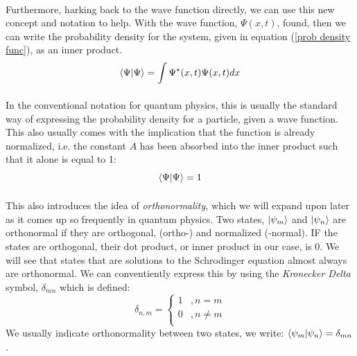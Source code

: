 \documentclass[12pt,letterpaper]{book}
\begin{document}
\paragraph*{}Furthermore, harking back to the wave function directly, we can use this new concept and notation to help. With the wave function, $\Psi(x,t)$, found, then we can write the probability density for the system, given in equation (\ref{prob density func}), as an inner product.
\begin{equation}
\label{inner prod integral}
\braket{\Psi}{\Psi} = \int \Psi^*(x,t) \Psi(x,t) dx
\end{equation}
\paragraph*{}In the conventional notation for quantum physics, this is usually the standard way of expressing the probability density for a particle, given a wave function. This also usually comes with the implication that the function is already normalized, i.e. the constant $A$ has been absorbed into the inner product such that it alone is equal to 1:
\begin{equation}
\braket{\Psi}{\Psi} = 1
\end{equation}
\paragraph*{}This also introduces the idea of \textit{orthonormality}, which we will expand upon later as it comes up so frequently in quantum physics. Two states, $\ket{\psi_m}$ and $\ket{\psi_n}$ are orthonormal if they are orthogonal, (ortho-) and normalized (-normal). IF the states are orthogonal, their dot product, or inner product in our case, is $0$. We will see that states that are solutions to the Schrodinger equation almost always are orthonormal. We can conventiently express this by using the \textit{Kronecker Delta} symbol, 
$\delta_{mn}$ which is defined:
\begin{equation}
\label{kronecker}
\delta_{n,m} = 
	\left\{
        \begin{array}{ll}
            1 	&, n = m \\
            0 	&, n \neq m \\
        \end{array}
    \right.
\end{equation}
We usually indicate orthonormality between two states, we write: $\braket{\psi_m}{\psi_n} = \delta_{mn}$.
\end{document}
